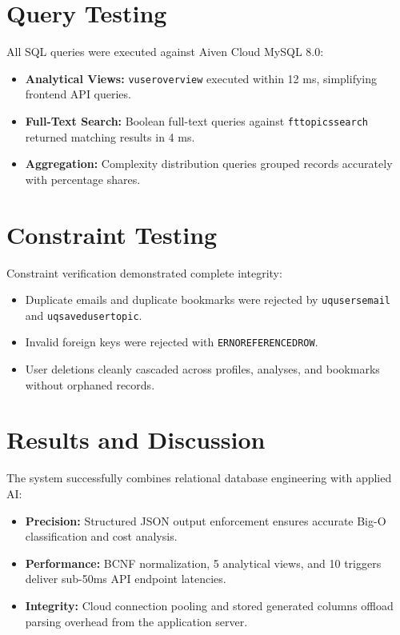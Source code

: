 \documentclass[12pt,a4paper]{report}
\DeclareRobustCommand{\_}{\textunderscore\allowbreak}
\begin{document}
\section{Query Testing}
All SQL queries were executed against Aiven Cloud MySQL 8.0:
\begin{itemize}
    \item \textbf{Analytical Views:} \texttt{v\_user\_overview} executed within 12 ms, simplifying frontend API queries.
    \item \textbf{Full-Text Search:} Boolean full-text queries against \texttt{ft\_topics\_search} returned matching results in 4 ms.
    \item \textbf{Aggregation:} Complexity distribution queries grouped records accurately with percentage shares.
\end{itemize}

\section{Constraint Testing}
Constraint verification demonstrated complete integrity:
\begin{itemize}
    \item Duplicate emails and duplicate bookmarks were rejected by \texttt{uq\_users\_email} and \texttt{uq\_saved\_user\_topic}.
    \item Invalid foreign keys were rejected with \texttt{ER\_NO\_REFERENCED\_ROW\_2}.
    \item User deletions cleanly cascaded across profiles, analyses, and bookmarks without orphaned records.
\end{itemize}

\section{Results and Discussion}
The system successfully combines relational database engineering with applied AI:
\begin{itemize}
    \item \textbf{Precision:} Structured JSON output enforcement ensures accurate Big-O classification and cost analysis.
    \item \textbf{Performance:} BCNF normalization, 5 analytical views, and 10 triggers deliver sub-50ms API endpoint latencies.
    \item \textbf{Integrity:} Cloud connection pooling and stored generated columns offload parsing overhead from the application server.
\end{itemize}
\end{document}
